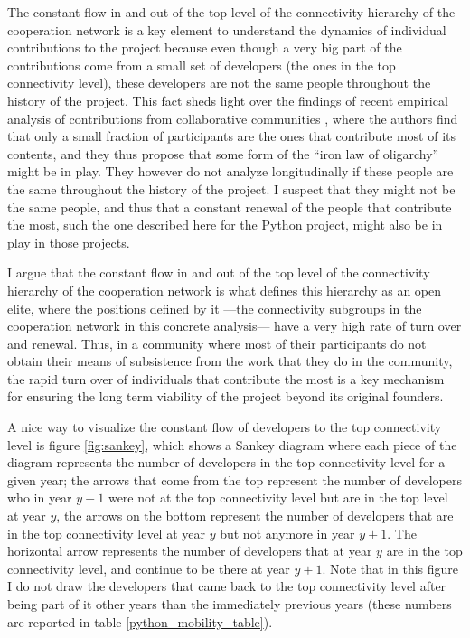 The constant flow in and out of the top level of the connectivity hierarchy of the cooperation network is a key element to understand the dynamics of individual contributions to the project because even though a very big part of the contributions come from a small set of developers (the ones in the top connectivity level), these developers are not the same people throughout the history of the project. This fact sheds light over the findings of recent empirical analysis of contributions from collaborative communities \citep{shaw:2014}, where the authors find that only a small fraction of participants are the ones that contribute most of its contents, and they thus propose that some form of the ``iron law of oligarchy'' might be in play. They however do not analyze longitudinally if these people are the same throughout the history of the project. I suspect that they might not be the same people, and thus that a constant renewal of the people that contribute the most, such the one described here for the Python project, might also be in play in those projects.  

I argue that the constant flow in and out of the top level of the connectivity hierarchy of the cooperation network is what defines this hierarchy as an open elite, where the positions defined by it ---the connectivity subgroups in the cooperation network in this concrete analysis--- have a very high rate of turn over and renewal. Thus, in a community where most of their participants do not obtain their means of subsistence from the work that they do in the community, the rapid turn over of individuals that contribute the most is a key mechanism for ensuring the long term viability of the project beyond its original founders.

A nice way to visualize the constant flow of developers to the top connectivity level is figure \ref{fig:sankey}, which shows a Sankey diagram where each piece of the diagram represents the number of developers in the top connectivity level for a given year; the arrows that come from the top represent the number of developers who in year $y - 1$ were not at the top connectivity level but are in the top level at year $y$, the arrows on the bottom represent the number of developers that are in the top connectivity level at year $y$ but not anymore in year $y + 1$. The horizontal arrow represents the number of developers that at year $y$ are in the top connectivity level, and continue to be there at year $y + 1$. Note that in this figure I do not draw the developers that came back to the top connectivity level after being part of it other years than the immediately previous years (these numbers are reported in table \ref{python_mobility_table}).

